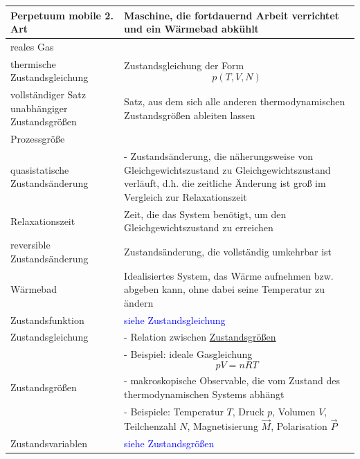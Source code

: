\documentclass{article}
\begin{document}
\begin{xltabular}{\linewidth}{p{6cm}|X}
	\hline
		Perpetuum mobile 2. Art & Maschine, die fortdauernd Arbeit verrichtet und ein Wärmebad abkühlt \\
	\hline
		reales Gas &  \\
	\hline
		thermische Zustandsgleichung & Zustandsgleichung der Form
			$$p(T,V,N)$$ \\
	\hline
		vollständiger Satz unabhängiger Zustandsgrößen & Satz, aus dem sich alle anderen thermodynamischen Zustandsgrößen ableiten lassen \\
	\hline
		Prozessgröße &  \\
	\hline
		quasistatische Zustandsänderung & - Zustandsänderung, die näherungsweise von Gleichgewichtszustand zu Gleichgewichtszustand verläuft, d.h. die zeitliche Änderung ist groß im Vergleich zur Relaxationszeit \\
	\hline
		Relaxationszeit & Zeit, die das System
benötigt, um den Gleichgewichtszustand zu erreichen \\
	\hline
		reversible Zustandsänderung & Zustandsänderung, die vollständig umkehrbar ist \\
	\hline
		Wärmebad & Idealisiertes System, das Wärme aufnehmen bzw. abgeben kann, ohne dabei seine Temperatur zu ändern \\
	\hline
		Zustandsfunktion & \textcolor{blue}{siehe Zustandsgleichung} \\
	\hline
		Zustandsgleichung & - Relation zwischen \underline{Zustandsgrößen} \\
		& - Beispiel: ideale Gasgleichung
			$$pV = nRT$$ \\
	\hline
		Zustandsgrößen & - makroskopische Observable, die vom Zustand des thermodynamischen Systems abhängt \\
		& - Beispiele: Temperatur $T$, Druck $p$, Volumen $V$, Teilchenzahl $N$, Magnetisierung $\vec{M}$, Polarisation $\vec{P}$ \\
	\hline
		Zustandsvariablen & \textcolor{blue}{siehe Zustandsgrößen} \\
	\hline\hline
\end{xltabular}
\end{document}
